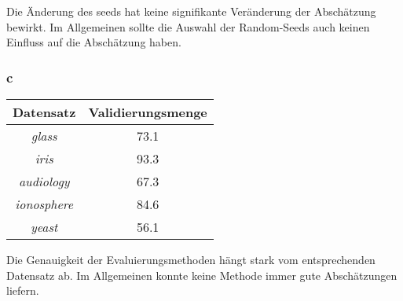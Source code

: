 Die \"Anderung des seeds hat keine signifikante Ver\"anderung der Absch\"atzung bewirkt. Im Allgemeinen sollte die Auswahl der Random-Seeds auch keinen Einfluss auf die Absch\"atzung haben.


\subsubsection*{c}
\begin{table}[htb]
	\centering
\begin{tabular}{c|c}
				Datensatz         & Validierungsmenge    \\ \hline
				\emph{glass}      & 73.1     \\ \hline
				\emph{iris}       & 93.3     \\ \hline
				\emph{audiology}  & 67.3   \\ \hline
				\emph{ionosphere} & 84.6   \\ \hline
				\emph{yeast}      & 56.1 \\ 
\end{tabular}
\end{table}

Die Genauigkeit der Evaluierungsmethoden h\"angt stark vom entsprechenden Datensatz ab. Im Allgemeinen konnte keine Methode immer gute Absch\"atzungen liefern.
